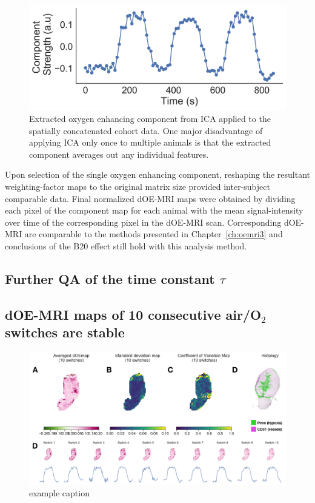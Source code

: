 \begin{figure}[htbp]
   \centering
   \includegraphics[width=\textwidth]{futurework/futurework-images/ISMRM2019_AARTS3_groupICA_OEcomponent.png} %
   \caption{Extracted oxygen enhancing component from \acs{ICA} applied to the spatially concatenated cohort data. One major disadvantage of applying \acs{ICA} only once to multiple animals is that the extracted component averages out any individual features.
   \label{groupICA1}}
\end{figure}

Upon selection of the single oxygen enhancing component, reshaping the resultant weighting-factor maps to the original matrix size provided inter-subject comparable data.
Final normalized \acs{dOE-MRI} maps were obtained by dividing each pixel of the component map for each animal with the mean signal-intensity over time of the corresponding pixel in the dOE-MRI scan.
Corresponding \acs{dOE-MRI} are comparable to the methods presented in Chapter~\ref{ch:oemri3} and conclusions of the B20 effect still hold with this analysis method.

\subsection{Further QA of the time constant $\tau$}

\subsection{dOE-MRI maps of 10 consecutive air/O$_2$ switches are stable}

\begin{figure}[htbp]
   \centering
   \includegraphics[width=\textwidth]{futurework/futurework-images/6_longcycles.png} %
   \caption{example caption}
   \label{longcycles}
\end{figure}

